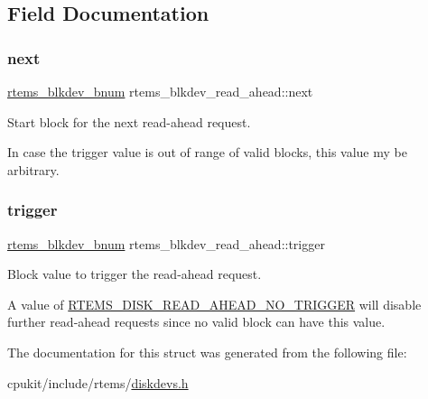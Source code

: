 \subsection{Field Documentation}
\mbox{\label{structrtems__blkdev__read__ahead_a3c9b04526854c11a902d6f4865c19b11}} 
\subsubsection{\texorpdfstring{next}{next}}
{\footnotesize\ttfamily \mbox{\hyperlink{group__rtems__disk_ga5fbcfd40b657bff6c54d9e393fab3274}{rtems\+\_\+blkdev\+\_\+bnum}} rtems\+\_\+blkdev\+\_\+read\+\_\+ahead\+::next}



Start block for the next read-\/ahead request. 

In case the trigger value is out of range of valid blocks, this value my be arbitrary. \mbox{\label{structrtems__blkdev__read__ahead_a6765fdf41740817fe7116e198ca3e59b}} 
\subsubsection{\texorpdfstring{trigger}{trigger}}
{\footnotesize\ttfamily \mbox{\hyperlink{group__rtems__disk_ga5fbcfd40b657bff6c54d9e393fab3274}{rtems\+\_\+blkdev\+\_\+bnum}} rtems\+\_\+blkdev\+\_\+read\+\_\+ahead\+::trigger}



Block value to trigger the read-\/ahead request. 

A value of \mbox{\hyperlink{group__rtems__disk_gaee772b1121d8d039acb0e0126341a1de}{R\+T\+E\+M\+S\+\_\+\+D\+I\+S\+K\+\_\+\+R\+E\+A\+D\+\_\+\+A\+H\+E\+A\+D\+\_\+\+N\+O\+\_\+\+T\+R\+I\+G\+G\+ER}} will disable further read-\/ahead requests since no valid block can have this value. 

The documentation for this struct was generated from the following file\+:\begin{DoxyCompactItemize}
\item 
cpukit/include/rtems/\mbox{\hyperlink{diskdevs_8h}{diskdevs.\+h}}\end{DoxyCompactItemize}
